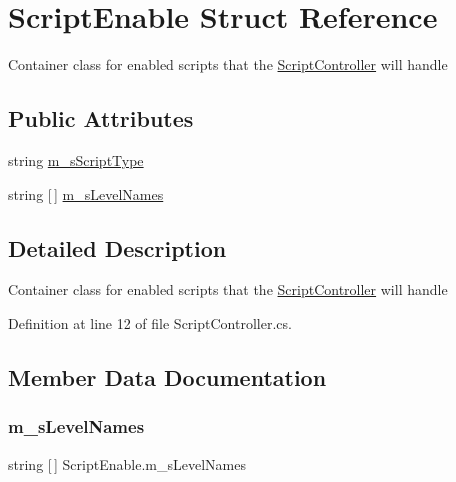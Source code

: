 \hypertarget{struct_script_enable}{}\section{Script\+Enable Struct Reference}
\label{struct_script_enable}


Container class for enabled scripts that the \mbox{\hyperlink{class_script_controller}{Script\+Controller}} will handle  


\subsection*{Public Attributes}
\begin{DoxyCompactItemize}
\item 
string \mbox{\hyperlink{struct_script_enable_a1bfbadb40830b59deac514213d211dd5}{m\+\_\+s\+Script\+Type}}
\item 
string \mbox{[}$\,$\mbox{]} \mbox{\hyperlink{struct_script_enable_a3ab800e1788041178a08591aa6768b1b}{m\+\_\+s\+Level\+Names}}
\end{DoxyCompactItemize}


\subsection{Detailed Description}
Container class for enabled scripts that the \mbox{\hyperlink{class_script_controller}{Script\+Controller}} will handle 



Definition at line 12 of file Script\+Controller.\+cs.



\subsection{Member Data Documentation}
\mbox{\label{struct_script_enable_a3ab800e1788041178a08591aa6768b1b}} 
\subsubsection{\texorpdfstring{m\+\_\+s\+Level\+Names}{m\_sLevelNames}}
{\footnotesize\ttfamily string \mbox{[}$\,$\mbox{]} Script\+Enable.\+m\+\_\+s\+Level\+Names}



